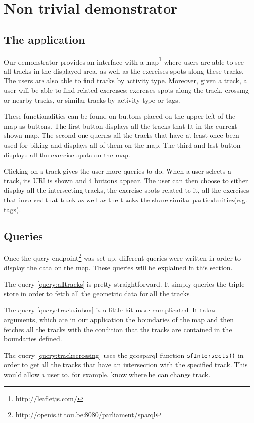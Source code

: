 \documentclass[11pt,a4paper]{scrreprt}
\begin{document}
\chapter{Non trivial demonstrator}
\section{The application}
Our demonstrator provides an interface with a map\footnote{http://leafletjs.com/} where users are able to see all tracks in the displayed area, as well as the exercises spots along these tracks. The users are also able to find tracks by activity type. Moreover, given a track, a user will be able to find related exercises: exercises spots along the track, crossing or nearby tracks, or similar tracks by activity type or tags.

These functionalities can be found on buttons placed on the upper left of the map as buttons. The first button displays all the tracks that fit in the current shown map. The second one queries all the tracks that have at least once been used for biking and displays all of them on the map. The third and last button displays all the exercise spots on the map.

Clicking on a track gives the user more queries to do. When a user selects a track, its URI is shown and 4 buttons appear. The user can then choose to either display all the intersecting tracks, the exercise spots related to it, all the exercises that involved that track as well as the tracks the share similar particularities(e.g. tags). 

\section{Queries}
Once the query endpoint\footnote{http://openis.ititou.be:8080/parliament/sparql} was set up, different queries were written in order to display the data on the map. These queries will be explained in this section. 

The query \ref{query:alltracks} is pretty straightforward. It simply queries the triple store in order to fetch all the geometric data for all the tracks.

The query \ref{query:tracksinbox} is a little bit more complicated. It takes arguments, which are in our application the boundaries of the map and then fetches all the tracks with the condition that the tracks are contained in the boundaries defined.

The query \ref{query:trackscrossing} uses the geosparql function \texttt{sfIntersects()} in order to get all the tracks that have an intersection with the specified track. This would allow a user to, for example, know where he can change track.
\end{document}
